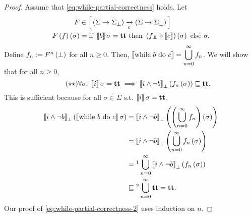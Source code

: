 \begin{proof}
	Assume that \cref{eq:while-partial-correctness} holds.
	Let
	\begin{align*}
		F                          & \in \left[ \, \left( \Sigma \to \Sigma_\bot \right) \xrightarrow[c]{} \left( \Sigma \to \Sigma_\bot \right) \, \right]                      \\
		F \left( f \right) \left( \sigma \right) & = \textrm{if } \left\llbracket b \right\rrbracket \sigma = \textbf{tt} \textrm{ then } \left(  f_{\bot \mkern-11mu \bot} \circ \left\llbracket c \right\rrbracket \right) \left( \sigma \right) \textrm{ else } \sigma.
	\end{align*}
	Define $f_n := F^n \left( \bot \right)$ for all $n \ge 0$.
	Then, $\displaystyle \left\llbracket \textrm{while } b \textrm{ do } c \right\rrbracket = \bigcup_{n = 0}^\infty f_n$.
	We will show that for all $n \ge 0$,
	\begin{equation} \label{eq:while-partial-correctness-2} \tag{$\star\star$}
		\forall \sigma .\;
		\left\llbracket i \right\rrbracket \sigma = \textbf{tt} \implies
		\left\llbracket i \wedge \neg b \right\rrbracket_\bot \left( f_n \left( \sigma \right) \right) \sqsubseteq \textbf{tt}.
	\end{equation}
	This is sufficient because for all $\sigma \in \Sigma$ s.t. $\left\llbracket i \right\rrbracket
		\sigma = \textbf{tt}$,
	\begin{align*}
		\bbrackets{i \wedge \neg b}_\bot \prths{\bbrackets{\cwhile{b}{c}} \sigma}
		 & = \bbrackets{i \wedge \neg b}_\bot \prths{\prths{\bigcup_{n = 0}^\infty f_n} \prths{\sigma}}       \\
		 & = \bbrackets{i \wedge \neg b}_\bot \prths{\bigcup_{n = 0}^\infty f_n \prths{\sigma}}               \\
		 & = \footnotemark \bigcup_{n = 0}^\infty \bbrackets{i \wedge \neg b}_\bot \prths{f_n \prths{\sigma}} \\
		 & \sqsubseteq \footnotemark \bigcup_{n = 0}^\infty \ttt = \ttt.
	\end{align*}
	Our proof of \cref{eq:while-partial-correctness-2} uses induction on $n$.


\end{proof}
